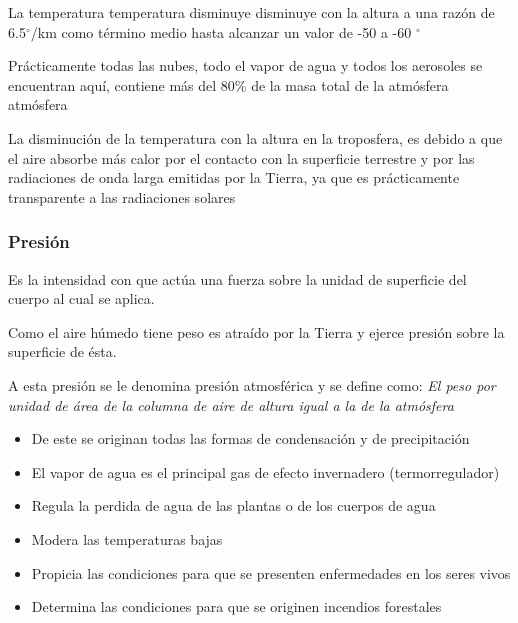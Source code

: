 La temperatura temperatura disminuye disminuye con la altura a una razón de 6.5$^{\circ}$/km como término medio hasta alcanzar un valor de -50 a -60 $^{\circ}$

Prácticamente todas las nubes, todo el vapor de agua y todos los aerosoles se encuentran aquí, contiene más del 80\% de la masa total de la atmósfera atmósfera

La disminución de la temperatura con la altura en la troposfera, es debido a que el aire absorbe más calor por el contacto con la superficie terrestre y por las radiaciones de onda larga emitidas por la Tierra, ya que es prácticamente transparente a las radiaciones solares

\subsubsection{Presión}
Es la intensidad con que actúa una fuerza sobre la unidad de superficie del cuerpo al cual se aplica.

Como el aire húmedo tiene peso es atraído por la Tierra y ejerce presión sobre la superficie de ésta.

A esta presión se le denomina presión atmosférica y se define como: \emph{El peso por unidad de área de la columna de aire de altura igual a la de la atmósfera}


\begin{itemize}
    \item De este se originan todas las formas de condensación y de precipitación
    \item El vapor de agua es el principal gas de efecto invernadero (termorregulador) 
    \item Regula la perdida de agua de las plantas o de los cuerpos de agua
    \item Modera las temperaturas bajas
    \item Propicia las condiciones para que se presenten enfermedades en los seres vivos
    \item Determina las condiciones para que se originen incendios forestales 
\end{itemize}

